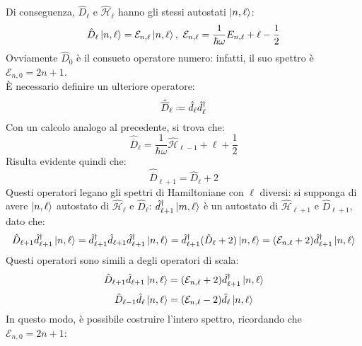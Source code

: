 Di conseguenza, $ \hat{D}_{\ell} $ e $ \hat{\mathcal{H}}_{\ell} $ hanno gli stessi autostati $ \ket{n,\ell} $:
\begin{equation}
	\hat{D}_{\ell} \ket{n,\ell} = \mathcal{E}_{n,\ell} \ket{n,\ell}, \,\, \mathcal{E}_{n,\ell} = \frac{1}{\hbar \omega} E_{n,\ell} + \ell - \frac{1}{2}
	\label{eq:3.31}
\end{equation}
Ovviamente $ \hat{D}_0 $ è il consueto operatore numero: infatti, il suo spettro è $ \mathcal{E}_{n,0} = 2n + 1 $.\\
È necessario definire un ulteriore operatore:
\begin{equation}
	\hat{\overline{D}}_{\ell} \defeq \hat{d}_{\ell} \hat{d}_{\ell}^{\dagger}
	\label{eq:3.32}
\end{equation}
Con un calcolo analogo al precedente, si trova che:
\begin{equation}
	\hat{\overline{D}}_{\ell} = \frac{1}{\hbar \omega} \hat{\mathcal{H}}_{\ell - 1} + \ell + \frac{1}{2}
	\label{eq:3.33}
\end{equation}
Risulta evidente quindi che:
\begin{equation}
	\hat{\overline{D}}_{\ell + 1} = \hat{D}_{\ell} + 2
	\label{eq:3.34}
\end{equation}
Questi operatori legano gli spettri di Hamiltoniane con $ \ell $ diversi: si supponga di avere $ \ket{n,\ell} $ autostato di $ \hat{\mathcal{H}}_{\ell} $ e $ \hat{D}_{\ell} $: $ \hat{d}_{\ell + 1}^{\dagger} \ket{m,\ell} $ è un autostato di $ \hat{\mathcal{H}}_{\ell + 1} $ e $ \hat{D}_{\ell + 1} $, dato che:
\begin{equation*}
	\hat{D}_{\ell + 1} \hat{d}_{\ell + 1}^{\dagger} \ket{n,\ell} = \hat{d}_{\ell + 1}^{\dagger} \hat{d}_{\ell + 1} \hat{d}_{\ell + 1}^{\dagger} \ket{n,\ell} = \hat{d}_{\ell + 1}^{\dagger} (\hat{D}_{\ell} + 2) \ket{n,\ell} = (\mathcal{E}_{n,\ell} + 2) \hat{d}_{\ell + 1}^{\dagger} \ket{n,\ell}
\end{equation*}
Questi operatori sono simili a degli operatori di scala:
\begin{equation}
	\hat{D}_{\ell + 1} \hat{d}_{\ell + 1} \ket{n,\ell} = (\mathcal{E}_{n,\ell} + 2) \hat{d}_{\ell + 1}^{\dagger} \ket{n,\ell}
	\label{eq:3.35}
\end{equation}
\begin{equation}
	\hat{D}_{\ell - 1} \hat{d}_{\ell} \ket{n,\ell} = (\mathcal{E}_{n,\ell} - 2) \hat{d}_{\ell} \ket{n,\ell}
	\label{eq:3.36}
\end{equation}
In questo modo, è possibile costruire l'intero spettro, ricordando che $ \mathcal{E}_{n,0} = 2n + 1 $:
